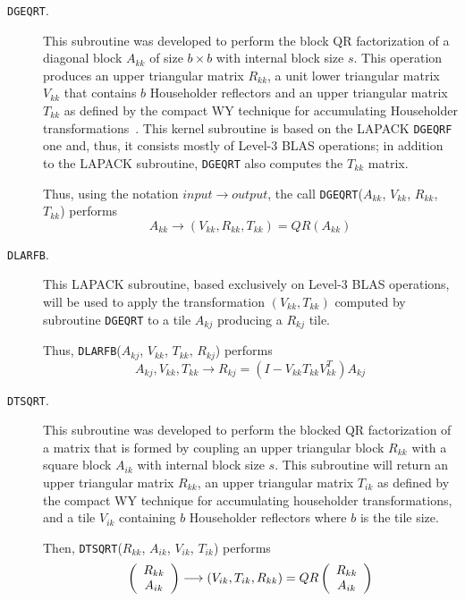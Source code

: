 \documentclass{article}
\begin{document}
\begin{description}
\item[\texttt{DGEQRT}.] This subroutine was developed to perform the
  block QR factorization of a diagonal
  block $A_{kk}$ of size $b \times b$ with internal block size
  $s$. This operation produces an upper triangular matrix $R_{kk}$, a
  unit lower triangular matrix $V_{kk}$ that contains $b$ Householder
  reflectors and an upper triangular matrix $T_{kk}$ as defined by the
  compact WY technique for accumulating Householder
  transformations~\cite{64889}. This kernel subroutine is based on the
  LAPACK \texttt{DGEQRF} one and, thus, it consists mostly of Level-3
  BLAS operations; in addition to the LAPACK subroutine,
  \texttt{DGEQRT} also computes the $T_{kk}$ matrix.

  Thus, using the notation $input \longrightarrow output$, the call
  \texttt{DGEQRT}($A_{kk}$, $V_{kk}$, $R_{kk}$, $T_{kk}$) performs 
  \begin{displaymath}
    A_{kk} \longrightarrow (V_{kk}, R_{kk}, T_{kk})=QR(A_{kk})
  \end{displaymath}

\item[\texttt{DLARFB}.] This LAPACK subroutine, based exclusively on
  Level-3 BLAS operations, will be used to apply
  the transformation $(V_{kk}, T_{kk})$ computed by subroutine
  \texttt{DGEQRT} to a tile $A_{kj}$ producing a $R_{kj}$ tile.

  Thus, \texttt{DLARFB}($A_{kj}$, $V_{kk}$, $T_{kk}$, $R_{kj}$) performs
  \begin{displaymath}
    A_{kj}, V_{kk}, T_{kk} \longrightarrow R_{kj}=(I-V_{kk}T_{kk}V^T_{kk})A_{kj}
  \end{displaymath}

\item[\texttt{DTSQRT}.] This subroutine was developed to perform the
  blocked QR factorization of a matrix that is formed by coupling an
  upper triangular block $R_{kk}$ with a square block $A_{ik}$ with
  internal block size $s$. This subroutine will return an upper
  triangular matrix $R_{kk}$, an upper triangular matrix
  $T_{ik}$ as defined by the compact WY technique for accumulating householder
  transformations, and a tile $V_{ik}$ containing $b$ Householder
  reflectors where $b$ is the tile size.

  Then, \texttt{DTSQRT}($R_{kk}$, $A_{ik}$, $V_{ik}$, $T_{ik}$) performs
  \begin{displaymath}
    \left(
      \begin{array}[!h]{c}
        R_{kk}\\
        A_{ik}
      \end{array}\right) \longrightarrow
        (V_{ik}, T_{ik}, R_{kk})=QR\left(\begin{array}[!h]{c}
        R_{kk}\\
        A_{ik}
      \end{array}\right)
  \end{displaymath}


\end{description}
\end{document}
